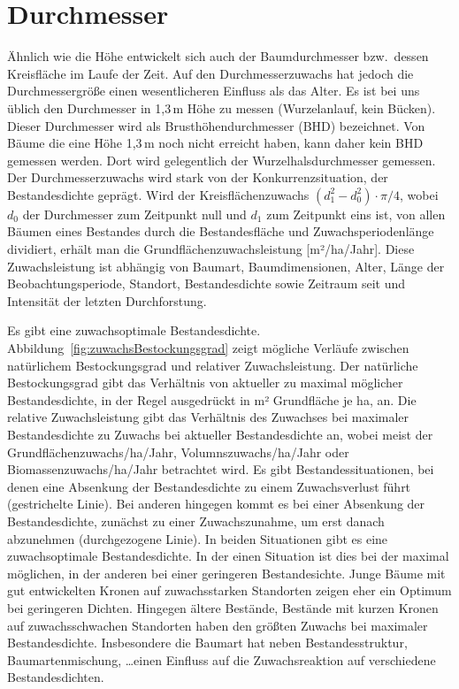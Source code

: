\documentclass[twocolumn]{scrartcl}
\begin{document}
\section{Durchmesser}

Ähnlich wie die Höhe entwickelt sich auch der Baumdurchmesser bzw.\ dessen
Kreisfläche im Laufe der Zeit. Auf den Durchmesserzuwachs hat jedoch die
Durchmessergröße einen wesentlicheren Einfluss als das Alter. Es ist bei uns
üblich den Durchmesser in 1,3\,m Höhe zu messen (Wurzelanlauf, kein Bücken).
Dieser Durchmesser wird als Brusthöhendurchmesser (BHD) bezeichnet. Von Bäume
die eine Höhe 1,3\,m noch nicht erreicht haben, kann daher kein BHD gemessen
werden. Dort wird gelegentlich der Wurzelhalsdurchmesser gemessen. Der
Durchmesserzuwachs wird stark von der Konkurrenzsituation, der Bestandesdichte
geprägt. Wird der Kreisflächenzuwachs $(d_1^2 - d_0^2)\cdot \pi/4$, wobei $d_0$
der Durchmesser zum Zeitpunkt null und $d_1$ zum Zeitpunkt eins ist, von allen
Bäumen eines Bestandes durch die Bestandesfläche und Zuwachsperiodenlänge
dividiert, erhält man die Grundflächenzuwachsleistung [m²/ha/Jahr]. Diese
Zuwachsleistung ist abhängig von Baumart, Baumdimensionen, Alter, Länge der
Beobachtungsperiode, Standort, Bestandesdichte sowie Zeitraum seit und
Intensität der letzten Durchforstung.

Es gibt eine zuwachsoptimale Bestandesdichte.
Abbildung~\ref{fig:zuwachsBestockungsgrad} zeigt mögliche Verläufe zwischen
natürlichem Bestockungsgrad und relativer Zuwachsleistung. Der natürliche
Bestockungsgrad gibt das Verhältnis von aktueller zu maximal möglicher
Bestandesdichte, in der Regel ausgedrückt in m² Grundfläche je ha, an. Die
relative Zuwachsleistung gibt das Verhältnis des Zuwachses bei maximaler
Bestandesdichte zu Zuwachs bei aktueller Bestandesdichte an, wobei meist der
Grundflächenzuwachs/ha/Jahr, Volumnszuwachs/ha/Jahr oder
Biomassenzuwachs/ha/Jahr betrachtet wird. Es gibt Bestandessituationen, bei
denen eine Absenkung der Bestandesdichte zu einem Zuwachsverlust führt
(gestrichelte Linie). Bei anderen hingegen kommt es bei einer Absenkung der
Bestandesdichte, zunächst zu einer Zuwachszunahme, um erst danach abzunehmen
(durchgezogene Linie). In beiden Situationen gibt es eine zuwachsoptimale
Bestandesdichte. In der einen Situation ist dies bei der maximal möglichen, in
der anderen bei einer geringeren Bestandesichte. Junge Bäume mit gut
entwickelten Kronen auf zuwachsstarken Standorten zeigen eher ein Optimum bei
geringeren Dichten. Hingegen ältere Bestände, Bestände mit kurzen Kronen auf
zuwachsschwachen Standorten haben den größten Zuwachs bei maximaler
Bestandesdichte. Insbesondere die Baumart hat neben Bestandesstruktur,
Baumartenmischung, \dots einen Einfluss auf die Zuwachsreaktion auf verschiedene
Bestandesdichten.
\end{document}
